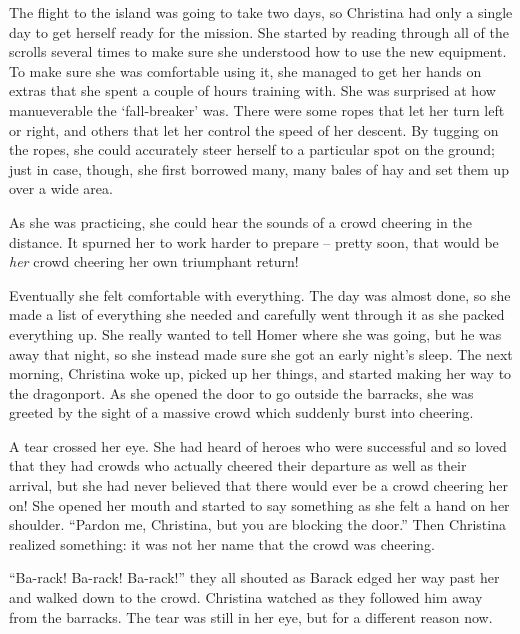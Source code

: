 \documentclass[showtrims,b6paper,draft,10pt]{memoir}
\begin{document}
\timeskip


The flight to the island was going to take two days, so Christina had only a single day to get herself ready for the mission.  She started by reading through all of the scrolls several times to make sure she understood how to use the new equipment.  To make sure she was comfortable using it, she managed to get her hands on extras that she spent a couple of hours training with.  She was surprised at how manueverable the `fall-breaker' was.  There were some ropes that let her turn left or right, and others that let her control the speed of her descent.  By tugging on the ropes, she could accurately steer herself to a particular spot on the ground;  just in case, though, she first borrowed many, many bales of hay and set them up over a wide area.

As she was practicing, she could hear the sounds of a crowd cheering in the distance.  It spurned her to work harder to prepare -- pretty soon, that would be \emph{her} crowd cheering her own triumphant return!

Eventually she felt comfortable with everything.  The day was almost done, so she made a list of everything she needed and carefully went through it as she packed everything up.  She really wanted to tell Homer where she was going, but he was away that night, so she instead made sure she got an early night's sleep.
The next morning, Christina woke up, picked up her things, and started making her way to the dragonport.  As she opened the door to go outside the barracks, she was greeted by the sight of a massive crowd which suddenly burst into cheering.

A tear crossed her eye.  She had heard of heroes who were successful and so loved that they had crowds who actually cheered their departure as well as their arrival, but she had never believed that there would ever be a crowd cheering her on!  She opened her mouth and started to say something as she felt a hand on her shoulder.  ``Pardon me, Christina, but you are blocking the door.''  Then Christina realized something: it was not her name that the crowd was cheering.

``Ba-rack!  Ba-rack! Ba-rack!'' they all shouted as Barack edged her way past her and walked down to the crowd.  Christina watched as they followed him away from the barracks.  The tear was still in her eye, but for a different reason now.
\end{document}
